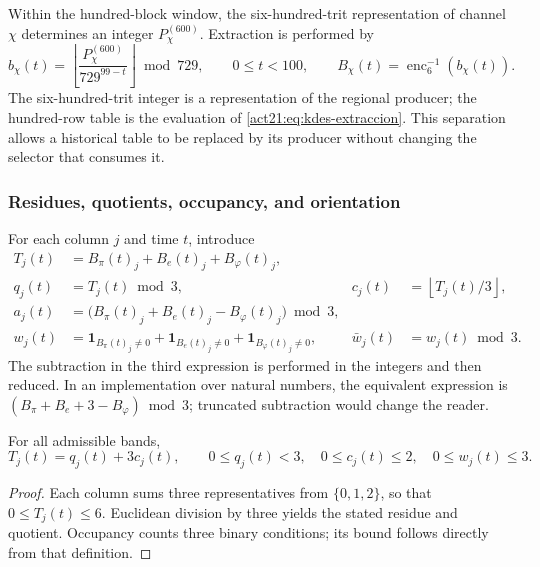 Within the hundred-block window, the six-hundred-trit representation of
channel $\chi$ determines an integer $P_\chi^{(600)}$. Extraction is performed
by
\begin{equation}
 b_\chi(t)=
 \left\lfloor\frac{P_\chi^{(600)}}{729^{99-t}}\right\rfloor\bmod729,
 \qquad 0\leq t<100,
 \qquad B_\chi(t)=\operatorname{enc}_6^{-1}(b_\chi(t)).
 \label{act21:eq:kdes-extraccion}
\end{equation}
The six-hundred-trit integer is a representation of the regional producer;
the hundred-row table is the evaluation of
\eqref{act21:eq:kdes-extraccion}. This separation allows a historical table
to be replaced by its producer without changing the selector that consumes it.

\subsubsection{Residues, quotients, occupancy, and orientation}

For each column $j$ and time $t$, introduce
\begin{align}
 T_j(t)&=B_\pi(t)_j+B_e(t)_j+B_\varphi(t)_j,\\
 q_j(t)&=T_j(t)\bmod3,
 &c_j(t)&=\left\lfloor T_j(t)/3\right\rfloor,\\
 a_j(t)&=\bigl(B_\pi(t)_j+B_e(t)_j-B_\varphi(t)_j\bigr)\bmod3,\\
 w_j(t)&=\mathbf1_{B_\pi(t)_j\ne0}
       +\mathbf1_{B_e(t)_j\ne0}
       +\mathbf1_{B_\varphi(t)_j\ne0},
 &\bar w_j(t)&=w_j(t)\bmod3.
 \label{act21:eq:kdes-firmas}
\end{align}
The subtraction in the third expression is performed in the integers and
then reduced. In an implementation over natural numbers, the equivalent expression
is $(B_\pi+B_e+3-B_\varphi)\bmod3$; truncated subtraction would change the reader.

\begin{proposition}
For all admissible bands,
\[
 T_j(t)=q_j(t)+3c_j(t),\qquad
 0\leq q_j(t)<3,\quad 0\leq c_j(t)\leq2,
 \quad0\leq w_j(t)\leq3.
\]
\end{proposition}
\begin{proof}
Each column sums three representatives from $\{0,1,2\}$, so that
$0\leq T_j(t)\leq6$. Euclidean division by three yields the stated residue
and quotient. Occupancy counts three binary conditions;
its bound follows directly from that definition.
\end{proof}

